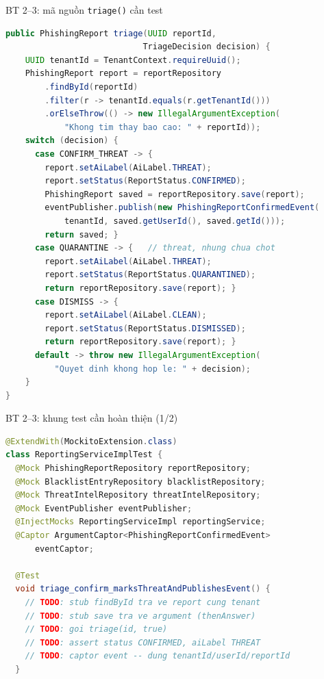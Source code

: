 \documentclass[aspectratio=169,12pt]{beamer}
\begin{document}
\begin{frame}[fragile,shrink=12]{BT 2--3: mã nguồn \texttt{triage()} cần test}
  \vspace*{-0.5em}
\begin{lstlisting}[language=java,basicstyle=\ttfamily\scriptsize]
public PhishingReport triage(UUID reportId,
                            TriageDecision decision) {
    UUID tenantId = TenantContext.requireUuid();
    PhishingReport report = reportRepository
        .findById(reportId)
        .filter(r -> tenantId.equals(r.getTenantId()))
        .orElseThrow(() -> new IllegalArgumentException(
            "Khong tim thay bao cao: " + reportId));
    switch (decision) {
      case CONFIRM_THREAT -> {
        report.setAiLabel(AiLabel.THREAT);
        report.setStatus(ReportStatus.CONFIRMED);
        PhishingReport saved = reportRepository.save(report);
        eventPublisher.publish(new PhishingReportConfirmedEvent(
            tenantId, saved.getUserId(), saved.getId()));
        return saved; }
      case QUARANTINE -> {   // threat, nhung chua chot
        report.setAiLabel(AiLabel.THREAT);
        report.setStatus(ReportStatus.QUARANTINED);
        return reportRepository.save(report); }
      case DISMISS -> {
        report.setAiLabel(AiLabel.CLEAN);
        report.setStatus(ReportStatus.DISMISSED);
        return reportRepository.save(report); }
      default -> throw new IllegalArgumentException(
          "Quyet dinh khong hop le: " + decision);
    }
}
\end{lstlisting}
\end{frame}

\begin{frame}[fragile]{BT 2--3: khung test cần hoàn thiện (1/2)}
\begin{lstlisting}[language=java,basicstyle=\ttfamily\scriptsize]
@ExtendWith(MockitoExtension.class)
class ReportingServiceImplTest {
  @Mock PhishingReportRepository reportRepository;
  @Mock BlacklistEntryRepository blacklistRepository;
  @Mock ThreatIntelRepository threatIntelRepository;
  @Mock EventPublisher eventPublisher;
  @InjectMocks ReportingServiceImpl reportingService;
  @Captor ArgumentCaptor<PhishingReportConfirmedEvent>
      eventCaptor;

  @Test
  void triage_confirm_marksThreatAndPublishesEvent() {
    // TODO: stub findById tra ve report cung tenant
    // TODO: stub save tra ve argument (thenAnswer)
    // TODO: goi triage(id, true)
    // TODO: assert status CONFIRMED, aiLabel THREAT
    // TODO: captor event -- dung tenantId/userId/reportId
  }
\end{lstlisting}
\end{frame}
\end{document}
